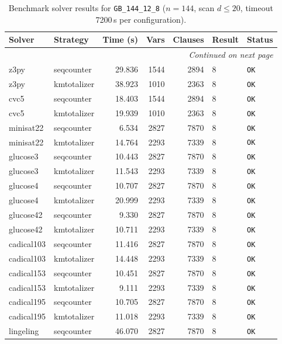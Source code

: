 \begin{longtable}{llrrrl p{}}
\caption{Benchmark solver results for \texttt{GB\_144\_12\_8} ($n=144$, scan $d \leq 20$, timeout 7200\,s per configuration).} \label{tab:bench-GB_144_12_8} \\
\toprule
Solver & Strategy & Time (s) & Vars & Clauses & Result & Status \\
\midrule
\endhead
\midrule
\multicolumn{7}{r}{\textit{Continued on next page}} \\
\midrule
\endfoot
\bottomrule
\endlastfoot
z3py & seqcounter & 29.836 & 1544 & 2894 & 8 & \texttt{OK} \\
z3py & kmtotalizer & 38.923 & 1010 & 2363 & 8 & \texttt{OK} \\
cvc5 & seqcounter & 18.403 & 1544 & 2894 & 8 & \texttt{OK} \\
cvc5 & kmtotalizer & 19.939 & 1010 & 2363 & 8 & \texttt{OK} \\
minisat22 & seqcounter & 6.534 & 2827 & 7870 & 8 & \texttt{OK} \\
minisat22 & kmtotalizer & 14.764 & 2293 & 7339 & 8 & \texttt{OK} \\
glucose3 & seqcounter & 10.443 & 2827 & 7870 & 8 & \texttt{OK} \\
glucose3 & kmtotalizer & 11.543 & 2293 & 7339 & 8 & \texttt{OK} \\
glucose4 & seqcounter & 10.707 & 2827 & 7870 & 8 & \texttt{OK} \\
glucose4 & kmtotalizer & 20.999 & 2293 & 7339 & 8 & \texttt{OK} \\
glucose42 & seqcounter & 9.330 & 2827 & 7870 & 8 & \texttt{OK} \\
glucose42 & kmtotalizer & 10.711 & 2293 & 7339 & 8 & \texttt{OK} \\
cadical103 & seqcounter & 11.416 & 2827 & 7870 & 8 & \texttt{OK} \\
cadical103 & kmtotalizer & 14.448 & 2293 & 7339 & 8 & \texttt{OK} \\
cadical153 & seqcounter & 10.451 & 2827 & 7870 & 8 & \texttt{OK} \\
cadical153 & kmtotalizer & 9.111 & 2293 & 7339 & 8 & \texttt{OK} \\
cadical195 & seqcounter & 10.705 & 2827 & 7870 & 8 & \texttt{OK} \\
cadical195 & kmtotalizer & 11.018 & 2293 & 7339 & 8 & \texttt{OK} \\
lingeling & seqcounter & 46.070 & 2827 & 7870 & 8 & \texttt{OK} \\

\end{longtable}

